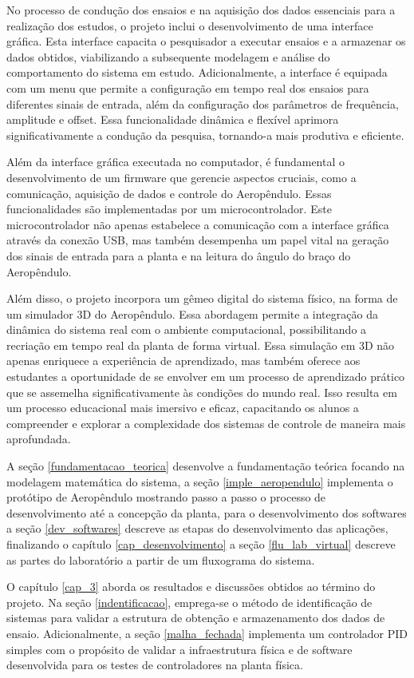 No processo de condução dos ensaios e na aquisição dos dados essenciais para a realização dos estudos, o projeto inclui o desenvolvimento de uma interface gráfica. Esta interface capacita o pesquisador a executar ensaios e a armazenar os dados obtidos, viabilizando a subsequente modelagem e análise do comportamento do sistema em estudo. Adicionalmente, a interface é equipada com um menu que permite a configuração em tempo real dos ensaios para diferentes sinais de entrada, além da configuração dos parâmetros de frequência, amplitude e offset. Essa funcionalidade dinâmica e flexível aprimora significativamente a condução da pesquisa, tornando-a mais produtiva e eficiente.

Além da interface gráfica executada no computador, é fundamental o desenvolvimento de um firmware que gerencie aspectos cruciais, como a comunicação, aquisição de dados e controle do Aeropêndulo. Essas funcionalidades são implementadas por um microcontrolador. Este microcontrolador não apenas estabelece a comunicação com a interface gráfica através da conexão USB, mas também desempenha um papel vital na geração dos sinais de entrada para a planta e na leitura do ângulo do braço do Aeropêndulo.


Além disso, o projeto incorpora um gêmeo digital do sistema físico, na forma de um simulador 3D do Aeropêndulo. Essa abordagem permite a integração da dinâmica do sistema real com o ambiente computacional, possibilitando a recriação em tempo real da planta de forma virtual. Essa simulação em 3D não apenas enriquece a experiência de aprendizado, mas também oferece aos estudantes a oportunidade de se envolver em um processo de aprendizado prático que se assemelha significativamente às condições do mundo real. Isso resulta em um processo educacional mais imersivo e eficaz, capacitando os alunos a compreender e explorar a complexidade dos sistemas de controle de maneira mais aprofundada.

A seção \ref{fundamentacao_teorica} desenvolve a fundamentação teórica focando na modelagem matemática do sistema, a seção \ref{imple_aeropendulo} implementa o protótipo de Aeropêndulo mostrando passo a passo o processo de desenvolvimento até a concepção da planta, para o desenvolvimento dos softwares a seção \ref{dev_softwares} descreve as etapas do desenvolvimento das aplicações, finalizando o capítulo \ref{cap_desenvolvimento} a seção \ref{flu_lab_virtual} descreve as partes do laboratório a partir de um fluxograma do sistema.

O capítulo \ref{cap_3} aborda os resultados e discussões obtidos ao término do projeto. Na seção \ref{indentificacao}, emprega-se o método de identificação de sistemas para validar a estrutura de obtenção e armazenamento dos dados de ensaio. Adicionalmente, a seção \ref{malha_fechada} implementa um controlador PID simples com o propósito de validar a infraestrutura física e de software desenvolvida para os testes de controladores na planta física.

